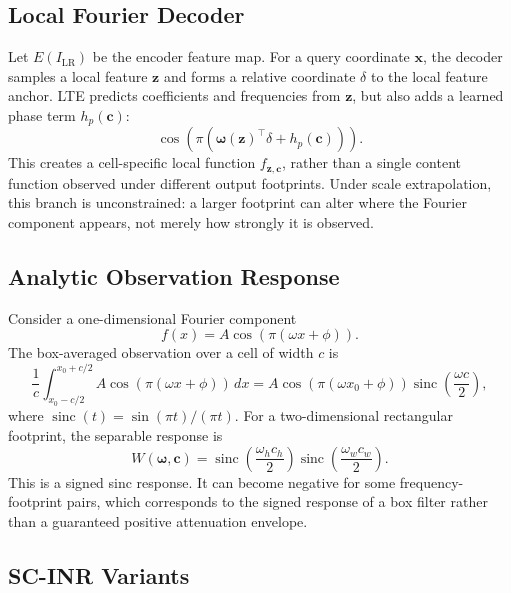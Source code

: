 \documentclass[10pt]{article}
\newcommand{\sinc}{\operatorname{sinc}}
\newcommand{\cell}{\mathbf{c}}
\newcommand{\coord}{\mathbf{x}}
\newcommand{\feat}{\mathbf{z}}
\newcommand{\freq}{\boldsymbol{\omega}}
\begin{document}
\subsection{Local Fourier Decoder}

Let \(E(I_{\mathrm{LR}})\) be the encoder feature map. For a query coordinate
\(\coord\), the decoder samples a local feature \(\feat\) and forms a relative
coordinate \(\delta\) to the local feature anchor. LTE predicts coefficients and
frequencies from \(\feat\), but also adds a learned phase term \(h_p(\cell)\):
\begin{equation}
  \cos\left(\pi(\freq(\feat)^\top \delta + h_p(\cell))\right).
\end{equation}
This creates a cell-specific local function \(f_{\feat,\cell}\), rather than a
single content function observed under different output footprints. Under scale
extrapolation, this branch is unconstrained: a larger footprint can alter where
the Fourier component appears, not merely how strongly it is observed.

\subsection{Analytic Observation Response}

Consider a one-dimensional Fourier component
\begin{equation}
  f(x)=A\cos(\pi(\omega x+\phi)).
\end{equation}
The box-averaged observation over a cell of width \(c\) is
\begin{equation}
  \frac{1}{c}\int_{x_0-c/2}^{x_0+c/2} A\cos(\pi(\omega x+\phi))\,dx
  =
  A\cos(\pi(\omega x_0+\phi))\sinc\left(\frac{\omega c}{2}\right),
\end{equation}
where \(\sinc(t)=\sin(\pi t)/(\pi t)\). For a two-dimensional rectangular
footprint, the separable response is
\begin{equation}
  W(\freq,\cell)=
  \sinc\left(\frac{\omega_h c_h}{2}\right)
  \sinc\left(\frac{\omega_w c_w}{2}\right).
\end{equation}
This is a signed sinc response. It can become negative for some
frequency-footprint pairs, which corresponds to the signed response of a box
filter rather than a guaranteed positive attenuation envelope.

\subsection{SC-INR Variants}
\end{document}

